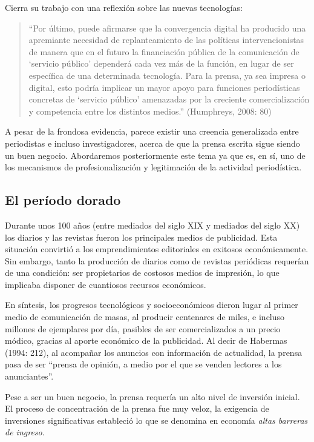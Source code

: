 Cierra su trabajo con una reflexión sobre las nuevas tecnologías:

\begin{quote}
	\enquote{Por último, puede afirmarse que la convergencia digital ha producido una apremiante necesidad de replanteamiento de las políticas intervencionistas de manera que en el futuro la financiación pública de la comunicación de \enquote{servicio público} dependerá cada vez más de la función, en lugar de ser específica de una determinada tecnología. Para la prensa, ya sea impresa o digital, esto podría implicar un mayor apoyo  para funciones periodísticas concretas de \enquote{servicio público} amenazadas por la creciente comercialización y competencia entre los distintos medios.} (Humphreys, 2008: 80)
\end{quote}


A pesar de la frondosa evidencia, parece existir una creencia generalizada entre periodistas e incluso investigadores, acerca de que la prensa escrita sigue siendo un buen negocio. Abordaremos posteriormente este tema ya que es, en sí, uno de los mecanismos de profesionalización y legitimación de la actividad periodística.

\subsection {El período dorado}

Durante unos 100 años (entre mediados del siglo XIX y mediados del siglo XX) los diarios y las revistas fueron los principales medios de publicidad. Esta situación convirtió a los emprendimientos editoriales en exitosos económicamente. Sin embargo, tanto la producción de diarios como de revistas periódicas requerían de una condición: ser propietarios de costosos medios de impresión, lo que implicaba disponer de cuantiosos recursos económicos.

En síntesis, los progresos tecnológicos y socioeconómicos dieron lugar al primer medio de comunicación de masas, al producir centenares de miles, e incluso millones de ejemplares por día, pasibles de ser comercializados a un precio módico, gracias al aporte económico de la publicidad. Al decir de Habermas (1994: 212), al acompañar los anuncios con información de actualidad, la prensa pasa de ser ``prensa de opinión, a medio por el que se venden lectores a los anunciantes''.

Pese a ser un buen negocio, la prensa requería un alto nivel de inversión inicial. El proceso de concentración de la prensa fue muy veloz, la exigencia de inversiones significativas estableció lo que se denomina en economía \emph{altas barreras de ingreso}.

